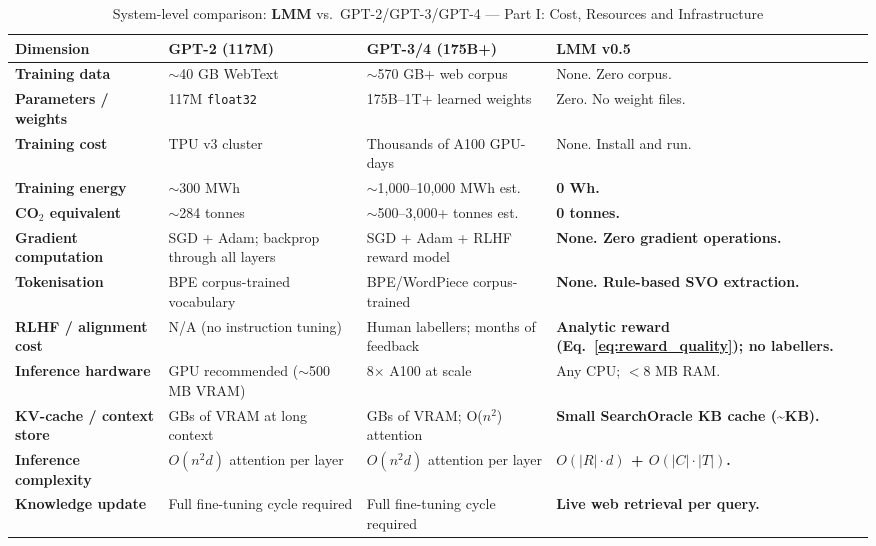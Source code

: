 \documentclass[11pt,a4paper]{article}
\newcommand{\lmm}{\texorpdfstring{%
  \textbf{\color{lmmAccent}LMM}}{LMM}}
\begin{document}
\begin{table}[H]
\centering
\caption{System-level comparison: \lmm{} vs.\ GPT-2/GPT-3/GPT-4 --- Part I: Cost, Resources and Infrastructure}
\label{tab:compare1}
\renewcommand{\arraystretch}{1.30}
\setlength{\tabcolsep}{5pt}
\begin{tabularx}{\linewidth}{@{}>{\bfseries}p{3.4cm} X X X@{}}
\toprule
\rowcolor{lmmHeaderBg}
{\color{white}\textbf{Dimension}} &
{\color{white}\textbf{GPT-2 (117M)}} &
{\color{white}\textbf{GPT-3/4 (175B+)}} &
{\color{white}\textbf{\lmm{} v0.5}} \\
\midrule
\rowcolor{white}
Training data &
$\sim$40 GB WebText \citep{radford2019language} &
$\sim$570 GB+ web corpus \citep{brown2020language} &
None. Zero corpus. \\
\rowcolor{lmmRowAlt}
Parameters / weights &
117M \texttt{float32} &
175B--1T+ learned weights &
Zero. No weight files. \\
\rowcolor{white}
Training cost &
TPU v3 cluster &
Thousands of A100 GPU-days &
None. Install and run. \\
\rowcolor{lmmRowAlt}
Training energy &
$\sim$300 MWh \citep{strubell2019energy} &
$\sim$1{,}000--10{,}000 MWh est. &
\textbf{0 Wh.} \\
\rowcolor{white}
CO$_2$ equivalent &
$\sim$284 tonnes \citep{strubell2019energy} &
$\sim$500--3{,}000+ tonnes est. &
\textbf{0 tonnes.} \\
\rowcolor{lmmRowAlt}
Gradient computation &
SGD + Adam; backprop through all layers &
SGD + Adam + RLHF reward model &
\textbf{None. Zero gradient operations.} \\
\rowcolor{white}
Tokenisation &
BPE corpus-trained vocabulary &
BPE/WordPiece corpus-trained &
\textbf{None. Rule-based SVO extraction.} \\
\rowcolor{lmmRowAlt}
RLHF / alignment cost &
N/A (no instruction tuning) &
Human labellers; months of feedback &
\textbf{Analytic reward (Eq.~\ref{eq:reward_quality}); no labellers.} \\
\rowcolor{white}
Inference hardware &
GPU recommended ($\sim$500 MB VRAM) &
8$\times$ A100 at scale &
Any CPU; $<$8 MB RAM. \\
\rowcolor{lmmRowAlt}
KV-cache / context store &
GBs of VRAM at long context &
GBs of VRAM; O($n^2$) attention &
\textbf{Small SearchOracle KB cache (\textasciitilde{}KB).} \\
\rowcolor{white}
Inference complexity &
$O(n^2 d)$ attention per layer &
$O(n^2 d)$ attention per layer &
\textbf{$O(|R|\cdot d)$ + $O(|C|\cdot|T|)$.} \\
\rowcolor{lmmRowAlt}
Knowledge update &
Full fine-tuning cycle required &
Full fine-tuning cycle required &
\textbf{Live web retrieval per query.} \\
\bottomrule
\end{tabularx}
\end{table}
\end{document}
